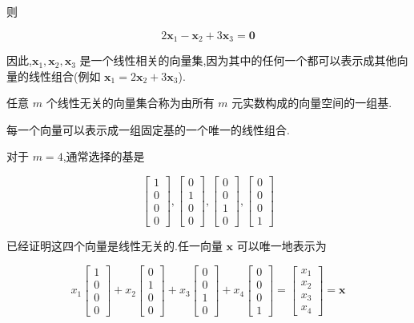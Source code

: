 则

\[
2\bm{x}_1 - \bm{x}_2 + 3\bm{x}_3 = \bm{0}
\]

因此,$\bm{x}_1 ,\bm{x}_2 ,\bm{x}_3$ 是一个线性相关的向量集,因为其中的任何一个都可以表示成其他向量的线性组合(例如 $\bm{x}_1 = 2\bm{x}_2 + 3\bm{x}_3$).

 \quad 任意 $m$ 个线性无关的向量集合称为由所有 $m$ 元实数构成的向量空间的一组基.

 \quad 每一个向量可以表示成一组固定基的一个唯一的线性组合.

对于 $m=4$,通常选择的基是

\[
\begin{bmatrix} 1 \\ 0 \\ 0 \\ 0 \end{bmatrix},
\begin{bmatrix} 0 \\ 1 \\ 0 \\ 0 \end{bmatrix},
\begin{bmatrix} 0 \\ 0 \\ 1 \\ 0 \end{bmatrix},
\begin{bmatrix} 0 \\ 0 \\ 0 \\ 1 \end{bmatrix}
\]

已经证明这四个向量是线性无关的.任一向量 $\bm{x}$ 可以唯一地表示为

\[
x_1 \begin{bmatrix} 1 \\ 0 \\ 0 \\ 0 \end{bmatrix} + x_2 \begin{bmatrix} 0 \\ 1 \\ 0 \\ 0 \end{bmatrix} + x_3 \begin{bmatrix} 0 \\ 0 \\ 1 \\ 0 \end{bmatrix} + x_4 \begin{bmatrix} 0 \\ 0 \\ 0 \\ 1 \end{bmatrix} = \begin{bmatrix} x_1 \\ x_2 \\ x_3 \\ x_4 \end{bmatrix} = \bm{x}
\]

